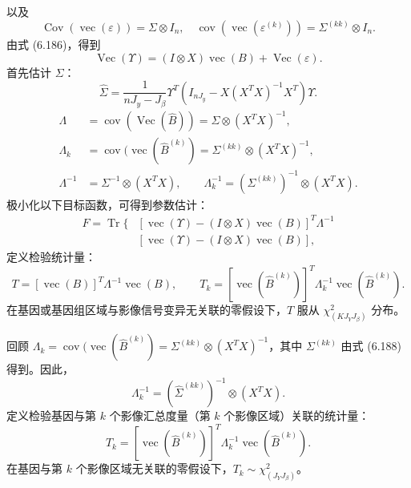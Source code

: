 以及
\begin{equation}
\operatorname{Cov}(\operatorname{vec}(\varepsilon))=\Sigma\otimes I_n,\quad
\operatorname{cov}(\operatorname{vec}(\varepsilon^{(k)}))=\Sigma^{(kk)}\otimes I_n.
\tag{6.187}
\end{equation}
由式 (6.186)，得到
\begin{equation}
\operatorname{Vec}(\Upsilon)=(I\otimes X)\operatorname{vec}(B)+\operatorname{Vec}(\varepsilon).
\tag{6.188}
\end{equation}
首先估计 $\Sigma$：
\begin{equation}
\widehat\Sigma=\frac1{nJ_y-J_\beta}\Upsilon^T\left(I_{nJ_y}-X(X^TX)^{-1}X^T\right)\Upsilon.
\tag{6.189}
\end{equation}
\[
\begin{aligned}
\Lambda&=\operatorname{cov}(\operatorname{Vec}(\widehat B))=\Sigma\otimes(X^TX)^{-1},\\
\Lambda_k&=\operatorname{cov}\bigl(\operatorname{vec}(\widehat B^{(k)})=\Sigma^{(kk)}\otimes(X^TX)^{-1},\\
\Lambda^{-1}&=\Sigma^{-1}\otimes(X^TX),\qquad
\Lambda_k^{-1}=(\Sigma^{(kk)})^{-1}\otimes(X^TX).
\end{aligned}
\]
极小化以下目标函数，可得到参数估计：
\[
\begin{aligned}
F=\operatorname{Tr}\bigl\{&[\operatorname{vec}(\Upsilon)-(I\otimes X)\operatorname{vec}(B)]^T\Lambda^{-1}\\
&[\operatorname{vec}(\Upsilon)-(I\otimes X)\operatorname{vec}(B)],
\end{aligned}
\]
定义检验统计量：
\[
T=[\operatorname{vec}(B)]^T\Lambda^{-1}\operatorname{vec}(B),\qquad
T_k=[\operatorname{vec}(\widehat B^{(k)})]^T\Lambda_k^{-1}\operatorname{vec}(\widehat B^{(k)}).
\]
在基因或基因组区域与影像信号变异无关联的零假设下，$T$ 服从 $\chi_{(KJ_YJ_\beta)}^2$ 分布。

回顾 $\Lambda_k=\operatorname{cov}(\operatorname{vec}(\widehat B^{(k)})=\Sigma^{(kk)}\otimes(X^TX)^{-1}$，其中 $\Sigma^{(kk)}$ 由式 (6.188) 得到。因此，
\[
\Lambda_k^{-1}=(\widehat\Sigma^{(kk)})^{-1}\otimes(X^TX).
\]
定义检验基因与第 $k$ 个影像汇总度量（第 $k$ 个影像区域）关联的统计量：
\[
T_k=[\operatorname{vec}(\widehat B^{(k)})]^T\Lambda_k^{-1}\operatorname{vec}(\widehat B^{(k)}).
\]
在基因与第 $k$ 个影像区域无关联的零假设下，$T_k\sim\chi_{(J_YJ_\beta)}^2$。
